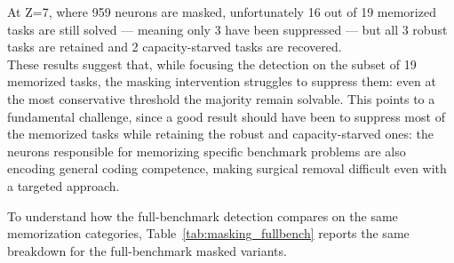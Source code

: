 \documentclass[mscthesis]{usiinfthesis}
\begin{document}
At Z=7, where 959 neurons are masked, unfortunately 16 out of 19 memorized tasks are still solved --- meaning only 3 have been suppressed --- but all 3 robust
tasks are retained and 2 capacity-starved tasks are recovered. \\
These results suggest that, while focusing the detection on the subset of 19 memorized tasks, the masking intervention struggles to suppress them:
even at the most conservative threshold the majority remain solvable. 
This points to a fundamental challenge, since a good result should have been to suppress most of the memorized tasks while retaining the robust and capacity-starved ones:
the neurons responsible for memorizing specific benchmark problems are also encoding general coding competence, making surgical removal difficult even with a targeted approach.
\par\vspace{1em}
To understand how the full-benchmark detection compares on the same memorization categories, Table~\ref{tab:masking_fullbench} reports the same breakdown for the full-benchmark masked variants.
\begin{table}[h]
\centering
\caption{Memorization category results for full-benchmark masked model variants.}
\label{tab:masking_fullbench}
\hspace*{-1.2cm}
\end{table}
\end{document}
